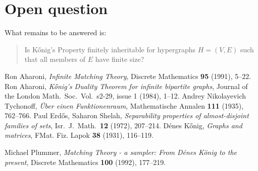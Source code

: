 \documentclass[12pt]{amsart}
\begin{document}
\section{Open question}
What remains to be answered is:
\begin{quote}
Is K\H{o}nig's Property finitely inheritable for hypergraphs $H=(V,E)$
such that all members of $E$ have finite size?
\end{quote}

{\footnotesize
\begin{thebibliography}{99}
 Ron Aharoni, {\it
Infinite Matching Theory}, Discrete Mathematics {\bf 95} (1991),
5--22.
 Ron Aharoni, {\it
K\H{o}nig's Duality Theorem for infinite bipartite graphs},
Journal of the London Math.~Soc.~Vol.~s2-29, issue 1 (1984), 1--12.
 Andrey Nikolayevich Tychonoff, {\it
\"Uber einen Funktionenraum}, Mathematische Annalen {\bf 111} (1935),
762--766.
 Paul Erd\H{o}s, Saharon Shelah, {\it 
Separability properties of almost-disjoint families of sets}, 
 Isr.~J.~Math.~{\bf 12} (1972), 207--214.
  Dénes K\H{o}nig, {\it
Graphs and matrices}, FMat. Fiz. Lapok {\bf 38} (1931),
116--119.
 
 Michael Plummer, {\it
Matching Theory - a sampler: From Dénes König to the present}, Discrete Mathematics {\bf 100} (1992),
177--219.
\end{thebibliography}
}
\end{document}

